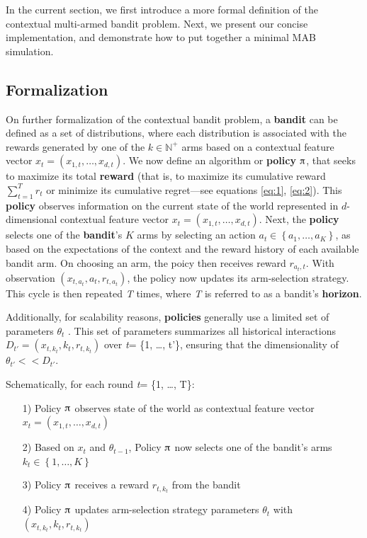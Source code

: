 \documentclass{jss}
\begin{document}
In the current section, we first introduce a more formal definition of the contextual multi-armed bandit problem. Next, we present our concise implementation, and demonstrate how to put together a minimal MAB simulation.

\subsection{Formalization} \label{formalization}

On further formalization of the contextual bandit problem, a \textbf{bandit} can be defined as a set of distributions, where each distribution is associated with the rewards generated by one of the $k\in \mathbb {N} ^{+}$ arms based on a contextual feature vector \(x_{t}=\left( x_{1,t},  \dots, x_{d,t}\right)\). We now define an algorithm or \textbf{policy} $\piup$, that seeks to maximize its total \textbf{reward} (that is, to maximize its cumulative reward $\sum_{t=1}^T r_t$ or minimize its cumulative regret---see equations \ref{eq:1}, \ref{eq:2}). This \textbf{policy} observes information on the current state of the world represented in $d$-dimensional contextual feature vector \(x_{t}=\left( x_{1,t},  \dots, x_{d,t}\right)\). Next, the \textbf{policy} selects one of the \textbf{bandit}'s $K$ arms by selecting an action \(a_{t} \in \left\{ a_1, \dots, a_K \right\}\), as based on the expectations of the context and the reward history of each available bandit arm. On choosing an arm, the poicy then receives reward \(r_{a_{t},t}\). With observation \( (x_{t,a_t},a_{t},r_{t,a_t}) \), the policy now updates its arm-selection strategy. This cycle is then repeated \textit{T} times, where \textit{T} is referred to as a bandit's \textbf{horizon}.

Additionally, for scalability reasons, \textbf{policies} generally use a limited set of parameters $\theta_{t}$ \citep{Kaptein2016}. This set of parameters summarizes all historical interactions \( D_{t'} = (x_{t,k_t},k_{t},r_{t,k_t}) \) over \emph{t}= \{1, \ldots, t'\}, ensuring that the dimensionality of $\theta_{t'} << D_{t'}$.

Schematically, for each round \emph{t}= \{1, \ldots, T\}:

\begin{enumerate}
         \item[1)] Policy $\piup$ observes state of the world as contextual feature vector \(x_{t}=\left( x_{1,t},  \dots, x_{d,t}\right)\)
         \item[2)] Based on $x_{t}$ and $\theta_{t-1}$, Policy $\piup$ now selects one of the bandit's arms \(k_{t} \in \left\{ 1, \dots, K \right\}\)
         \item[3)] Policy $\piup$ receives a reward \(r_{t,k_t}\) from the bandit
         \item[4)] Policy $\piup$ updates arm-selection strategy parameters $\theta_{t}$ with \( (x_{t,k_t},k_{t},r_{t,k_t}) \)
\end{enumerate}
\end{document}

